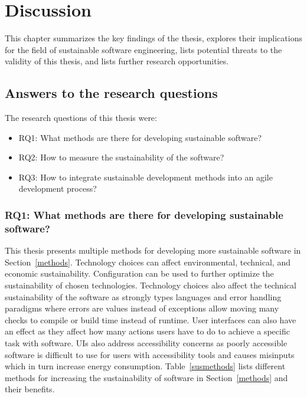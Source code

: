 \chapter{Discussion}\label{discussion}
This chapter summarizes the key findings of the thesis, explores their implications for the field of sustainable software engineering, lists potential threats to the validity of this thesis, and lists further research opportunities.

\section{Answers to the research questions}
The research questions of this thesis were:
\begin{itemize}
    \item RQ1: What methods are there for developing sustainable software?
    \item RQ2: How to measure the sustainability of the software?
    \item RQ3: How to integrate sustainable development methods into an agile development process?
\end{itemize}

\subsection{RQ1: What methods are there for developing sustainable software?}
This thesis presents multiple methods for developing more sustainable software in Section~\ref{methods}. Technology choices can affect environmental, technical, and economic sustainability. Configuration can be used to further optimize the sustainability of chosen technologies. Technology choices also affect the technical sustainability of the software as strongly types languages and error handling paradigms where errors are values instead of exceptions allow moving many checks to compile or build time instead of runtime. User interfaces can also have an effect as they affect how many actions users have to do to achieve a specific task with software. UIs also address accessibility concerns as poorly accessible software is difficult to use for users with accessibility tools and causes misinputs which in turn increase energy consumption. Table~\ref{susmethods} lists different methods for increasing the sustainability of software in Section~\ref{methods} and their benefits.

